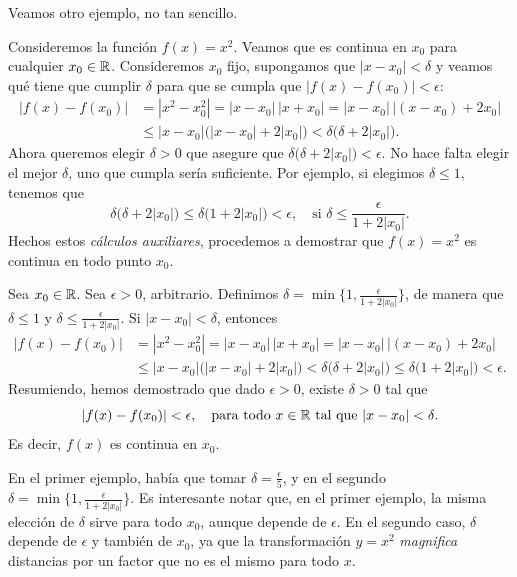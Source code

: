 Veamos otro ejemplo, no tan sencillo.
\begin{example}
    Consideremos la función $f(x)=x^2$. Veamos que es continua en $x_0$ para cualquier $x_0\in\mathbb{R}$. Consideremos $x_0$ fijo, supongamos que $|x-x_0|<\delta$ y veamos qué tiene que cumplir $\delta$ para que se cumpla que $|f(x)-f(x_0)|<\epsilon$:
\begin{align*}
 |f(x)-f(x_0)|  
    &= |x^2 - x_0^2| = |x-x_0| \, |x+x_0|
    = |x-x_0| \, |(x-x_0)+2x_0|
    \\
    &\le |x-x_0| \big( |x-x_0|+2|x_0| \big)
    < \delta \big( \delta + 2 |x_0|\big).
\end{align*}
Ahora queremos elegir $\delta>0$ que asegure que $\delta \big( \delta + 2 |x_0|\big) < \epsilon$. No hace falta elegir el mejor $\delta$, uno que cumpla sería suficiente. Por ejemplo, si elegimos $\delta \le 1$, tenemos
que
\[
\delta \big( \delta + 2 |x_0|\big) \le \delta \big( 1 + 2 |x_0|\big)
< \epsilon, \quad\text{si } \delta \le \frac{\epsilon}{1 + 2 |x_0|}.
\]
Hechos estos \emph{cálculos auxiliares}, procedemos a demostrar que $f(x)=x^2$ es continua en todo punto $x_0$.

Sea $x_0\in\mathbb{R}$. Sea $\epsilon > 0$, arbitrario. Definimos $\delta = \min\{1,\frac{\epsilon}{1 + 2 |x_0|}\}$, de manera que $\delta\le 1$ y $\delta \le \frac{\epsilon}{1 + 2 |x_0|}$. Si $|x-x_0|<\delta$, entonces
\begin{align*}
 |f(x)-f(x_0)|  
    &= |x^2 - x_0^2| = |x-x_0| \, |x+x_0|
    = |x-x_0| \, |(x-x_0)+2x_0|
    \\
    &\le |x-x_0| \big( |x-x_0|+2|x_0| \big)
    < \delta \big( \delta + 2 |x_0|\big)
    \le \delta \big( 1 + 2 |x_0|\big)
< \epsilon.
\end{align*}
Resumiendo, hemos demostrado que dado $\epsilon > 0$, existe $\delta > 0$ tal que 
\[
|f(x)-f(x_0)|<\epsilon, \quad\text{para todo $x\in \mathbb{R}$ tal que $|x-x_0|<\delta$}.
\]
Es decir, $f(x)$ es continua en $x_0$.
\end{example}

\begin{remark}
    En el primer ejemplo, había que tomar $\delta = \frac\epsilon5$, y en el segundo $\delta = \min\{1,\frac{\epsilon}{1 + 2 |x_0|}\}$. Es interesante notar que, en el primer ejemplo, la misma elección de $\delta$ sirve para todo $x_0$, aunque depende de $\epsilon$. 
    En el segundo caso, $\delta$ depende de $\epsilon$ y también de $x_0$, ya que la transformación $y=x^2$ \emph{magnifica} distancias por un factor que no es el mismo para todo $x$.
\end{remark}

